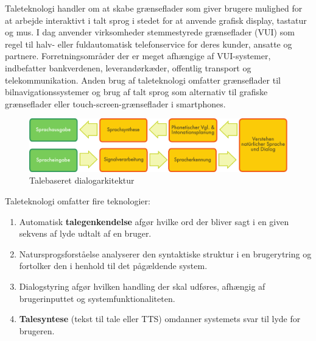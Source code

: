 \documentclass[]{../../metanetpaper}
\begin{document}
\begin{multicols}{2}
 Taleteknologi handler om at skabe gr\ae nseflader som giver brugere mulighed for at arbejde interaktivt i talt sprog i stedet for at anvende grafisk display, tastatur og mus. I dag anvender virksomheder stemmestyrede gr\ae nseflader (VUI) som regel til halv- eller fuldautomatisk telefonservice for deres kunder, ansatte og partnere. Forretningsomr\aa der der er meget afh\ae ngige af VUI-systemer, indbefatter bankverdenen, leverand\o rk\ae der, offentlig transport og telekommunikation. Anden brug af taleteknologi omfatter gr\ae nseflader til bilnavigationssystemer og brug af talt sprog som alternativ til grafiske gr\ae nseflader eller touch-screen-gr\ae nseflader i smartphones. 


\begin{figure}[htb]
  \center 
  \includegraphics[width=\textwidth]{../_media/german/simple_speech-based_dialogue_architecture}
  \caption{Talebaseret dialogarkitektur}
  \label{fig:dialoguearch_de}
\end{figure}

Taleteknologi omfatter fire teknologier:

\begin{enumerate}
  \item Automatisk {\bf talegenkendelse} afg\o r hvilke ord der bliver sagt i en given sekvens af lyde udtalt af en bruger.
      \item Natursprogsforst\aa else analyserer den syntaktiske struktur i en brugerytring og fortolker den i henhold til det p\aa g\ae ldende system.
      \item  Dialogstyring afg\o r hvilken handling der skal udf\o res, afh\ae ngig af brugerinputtet og systemfunktionaliteten.
      \item {\bf Talesyntese} (tekst til tale eller TTS) omdanner systemets svar til lyde for brugeren.
\end{enumerate}


\end{multicols}
\end{document}
